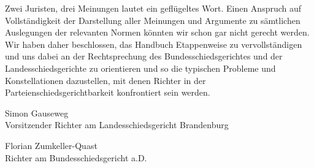 Zwei Juristen, drei Meinungen lautet ein geflügeltes Wort.
Einen Anspruch auf Vollständigkeit der Darstellung aller Meinungen und Argumente zu sämtlichen Auslegungen der relevanten Normen könnten wir schon gar nicht gerecht werden.
Wir haben daher beschlossen, das Handbuch Etappenweise zu vervollständigen und uns dabei an der Rechtsprechung des Bundesschiedsgerichtes und der Landesschiedsgerichte zu orientieren und so die typischen Probleme und Konstellationen dazustellen, mit denen Richter in der Parteienschiedsgerichtbarkeit konfrontiert sein werden.

\vspace{20mm}

Simon Gauseweg\\
Vorsitzender Richter am Landesschiedsgericht Brandenburg

\vspace{5mm}

Florian Zumkeller-Quast\\
Richter am Bundesschiedsgericht a.D.


 